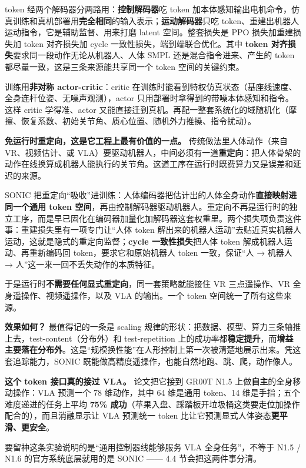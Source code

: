 \documentclass[
  chinese,
]{ctexart}
\begin{document}
token 经两个解码器分两路用：\textbf{控制解码器}吃 token
加本体感知输出电机命令，仿真训练和真机部署用\textbf{完全相同}的输入表示；\textbf{运动解码器}只吃
token、重建出机器人运动指令，它是辅助监督、用来打磨 latent
空间。整套损失是 PPO 损失加重建损失加 token 对齐损失加 cycle
一致性损失，端到端联合优化。其中 \textbf{token
对齐损失}要求同一段动作无论从机器人、人体 SMPL 还是混合指令进来、产生的
token 都尽量一致，这是三条来源能共享同一个 token 空间的关键约束。

训练用\textbf{非对称 actor-critic}：critic
在训练时能看到特权仿真状态（基座线速度、全身连杆位姿、无噪声观测），actor
只用部署时拿得到的带噪本体感知和指令。这样 critic 学得准、actor
又能直接迁到真机。再配一整套系统化的域随机化（摩擦、恢复系数、初始关节角、质心位置、随机外力推搡、指令扰动）。

\textbf{免运行时重定向，这是它工程上最有价值的一点。}
传统做法里人体动作（来自 VR、视频估计、或
VLA）要驱动机器人，中间必须有一道\textbf{重定向}：把人体骨架的动作在线换算成机器人能执行的关节角。这道工序在运行时既费算力又是误差和延迟的来源。

SONIC
把重定向``吸收''进训练：人体编码器把估计出的人体全身动作\textbf{直接映射进同一个通用
token
空间}，再由控制解码器驱动机器人。重定向不再是运行时的独立工序，而是早已固化在编码器加量化加解码器这套权重里。两个损失项负责这件事：重建损失里有一项专门让``人体
token
解出来的机器人运动''去贴近真实机器人运动，这就是隐式的重定向监督；\textbf{cycle
一致性损失}把人体 token 解成机器人运动、再重新编码回
token，要求它和原始机器人 token 一致，保证``人 → 机器人 →
人''这一来一回不丢失动作的本质特征。

于是运行时\textbf{不需要任何显式重定向}，同一套策略就能接住 VR
三点遥操作、VR 全身遥操作、视频遥操作，以及 VLA 的输出。一个 token
空间统一了所有这些来源。

\textbf{效果如何？} 最值得记的一条是 scaling
规律的形状：把数据、模型、算力三条轴推上去，test-content（分布外）和
test-repetition
上的成功率都\textbf{稳定提升}，而\textbf{增益主要落在分布外}。这是``规模换性能''在人形控制上第一次被清楚地展示出来。凭这套追踪能力，SONIC
既能做高精度遥操作，也能自然地跑、跳、爬，动作像人。

\textbf{这个 token 接口真的接过 VLA。} 论文把它接到 GR00T N1.5
上做\textbf{自主}的全身移动操作：VLA 预测一个 78 维动作，其中 64
维是通用 token、14 维是手指；五个难度递进的任务上平均 \textbf{75\%
成功}（苹果入盘、踩踏板开垃圾桶这类要走位加操作配合的），而且消融显示让
VLA 预测统一 token 比让它预测显式人体姿态\textbf{更平滑、更安全}。

要留神这条实验说明的是``通用控制器线能够服务 VLA 全身任务''，不等于 N1.5
/ N1.6 的官方系统底层就用的是 SONIC ------ 4.4 节会把这两件事分清。
\end{document}
